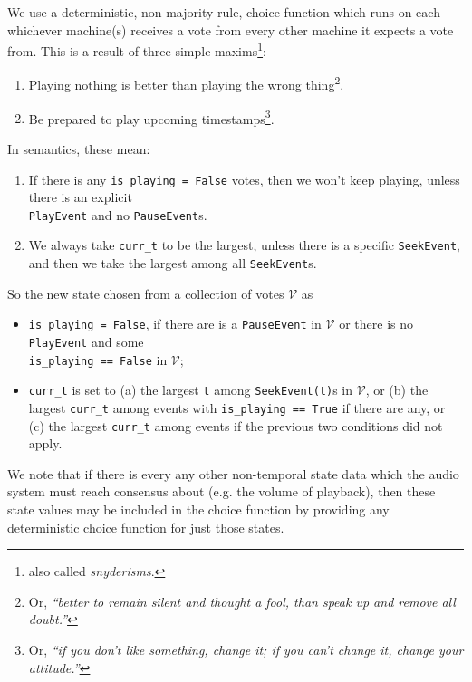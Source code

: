 \documentclass[%
               nonacm,sigconf,10pt]{acmart}
\newcommand{\py}[1]{\texttt{#1}}
\begin{document}
We use a deterministic, non-majority rule, choice function which runs on each whichever machine(s) receives a vote from every other machine it expects a vote from. This is a result of three simple maxims\footnote{also called {\it snyderisms}.}:

\begin{enumerate}
    \item Playing nothing is better than playing the wrong thing\footnote{Or, {\it ``better to remain silent and thought a fool, than speak up and remove all doubt.''}}.
    \item Be prepared to play upcoming timestamps\footnote{Or, {\it ``if you don't like something, change it; if you can't change it, change your attitude.''}}.
\end{enumerate}

In semantics, these mean:

\begin{enumerate}
    \item If there is any \py{is_playing = False} votes, then we won't keep playing, unless there is an explicit \\ \py{PlayEvent} and no \py{PauseEvent}s.
    \item We always take \py{curr_t} to be the largest, unless there is a specific \py{SeekEvent}, and then we take the largest among all \py{SeekEvent}s.
\end{enumerate}

So the new state chosen from a collection of votes $\mathcal{V}$ as

\begin{itemize}
    \item \py{is_playing = False}, if there are is a \py{PauseEvent} in $\mathcal{V}$ or there is no \py{PlayEvent} and some \\ \py{is_playing == False} in $\mathcal{V}$;
    \item \py{curr_t} is set to (a) the largest \py{t} among \py{SeekEvent(t)}s in $\mathcal{V}$, or (b) the largest \py{curr_t} among events with \py{is_playing == True} if there are any, or (c) the largest \py{curr_t} among events if the previous two conditions did not apply.
\end{itemize}

We note that if there is every any other non-temporal state data which the audio system must reach consensus about (e.g. the volume of playback), then these state values may be included in the choice function by providing any deterministic choice function for just those states.
\end{document}
